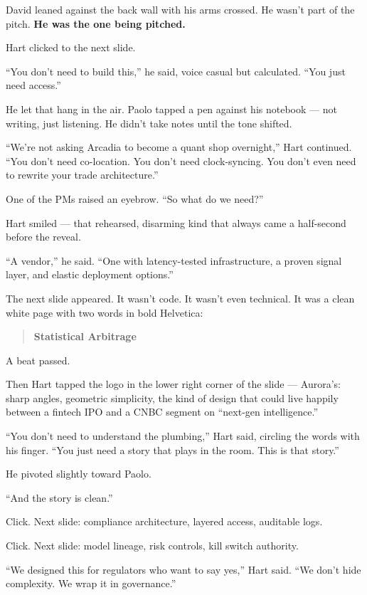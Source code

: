 \medskip

David leaned against the back wall with his arms crossed. He wasn’t part of the pitch. \textbf{He was the one being pitched.}

Hart clicked to the next slide.

“You don’t need to build this,” he said, voice casual but calculated.  
“You just need access.”

He let that hang in the air. Paolo tapped a pen against his notebook — not writing, just listening. He didn’t take notes 
until the tone shifted.

“We’re not asking Arcadia to become a quant shop overnight,” Hart continued.  
“You don’t need co-location. You don’t need clock-syncing. You don’t even need to rewrite your trade architecture.”

One of the PMs raised an eyebrow. “So what do we need?”

Hart smiled — that rehearsed, disarming kind that always came a half-second before the reveal.

“A vendor,” he said. “One with latency-tested infrastructure, a proven signal layer, and elastic deployment options.”

The next slide appeared. It wasn’t code. It wasn’t even technical.  
It was a clean white page with two words in bold Helvetica:

\begin{quote}
\centering
\textbf{Statistical Arbitrage}
\end{quote}

A beat passed.

Then Hart tapped the logo in the lower right corner of the slide — Aurora’s: sharp angles, geometric simplicity, the kind of 
design that could live happily between a fintech IPO and a CNBC segment on “next-gen intelligence.”

“You don’t need to understand the plumbing,” Hart said, circling the words with his finger.  
“You just need a story that plays in the room. This is that story.”

He pivoted slightly toward Paolo.

“And the story is clean.”  

Click. Next slide: compliance architecture, layered access, auditable logs.  

Click. Next slide: model lineage, risk controls, kill switch authority.

“We designed this for regulators who want to say yes,” Hart said. “We don’t hide complexity. We wrap it in governance.”

